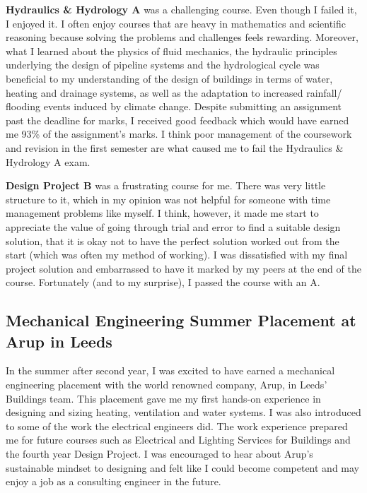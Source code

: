 \textbf{Hydraulics \& Hydrology A} was a challenging course.
Even though I failed it, I enjoyed it.
I often enjoy courses that are heavy in mathematics and scientific reasoning because solving the problems and challenges feels rewarding.
Moreover, what I learned about the physics of fluid mechanics, the hydraulic principles underlying the design of pipeline systems and the hydrological cycle was beneficial to my understanding of the design of buildings in terms of water, heating and drainage systems, as well as the adaptation to increased rainfall/ flooding events induced by climate change.
Despite submitting an assignment past the deadline for marks, I received good feedback which would have earned me 93\% of the assignment's marks.
I think poor management of the coursework and revision in the first semester are what caused me to fail the Hydraulics \& Hydrology A exam.

\textbf{Design Project B} was a frustrating course for me.
There was very little structure to it, which in my opinion was not helpful for someone with time management problems like myself.
I think, however, it made me start to appreciate the value of going through trial and error to find a suitable design solution, that it is okay not to have the perfect solution worked out from the start (which was often my method of working).
I was dissatisfied with my final project solution and embarrassed to have it marked by my peers at the end of the course.
Fortunately (and to my surprise), I passed the course with an A.



\subsection{Mechanical Engineering Summer Placement at Arup in Leeds}

In the summer after second year, I was excited to have earned a mechanical engineering placement with the world renowned company, Arup, in Leeds' Buildings team.
This placement gave me my first hands-on experience in designing and sizing heating, ventilation and water systems.
I was also introduced to some of the work the electrical engineers did.
The work experience prepared me for future courses such as Electrical and Lighting Services for Buildings and the fourth year Design Project.
I was encouraged to hear about Arup's sustainable mindset to designing and felt like I could become competent and may enjoy a job as a consulting engineer in the future.

